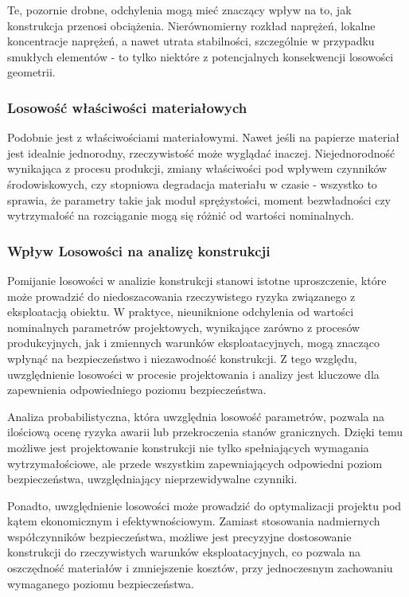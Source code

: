 Te, pozornie drobne, odchylenia mogą mieć znaczący wpływ na to, jak konstrukcja przenosi obciążenia.
Nierównomierny rozkład naprężeń, lokalne koncentracje naprężeń, a nawet utrata stabilności, szczególnie w przypadku smukłych elementów - to tylko niektóre z potencjalnych konsekwencji losowości geometrii.

\subsubsection*{Losowość właściwości materiałowych}

Podobnie jest z właściwościami materiałowymi.
Nawet jeśli na papierze materiał jest idealnie jednorodny, rzeczywistość może wyglądać inaczej.
Niejednorodność wynikająca z procesu produkcji, zmiany właściwości pod wpływem czynników środowiskowych, czy stopniowa degradacja materiału w czasie - wszystko to sprawia, że parametry takie jak moduł sprężystości, moment bezwładności czy wytrzymałość na rozciąganie mogą się różnić od wartości nominalnych.

\subsubsection*{Wpływ Losowości na analizę konstrukcji}

Pomijanie losowości w analizie konstrukcji stanowi istotne uproszczenie, które może prowadzić do niedoszacowania rzeczywistego ryzyka związanego z eksploatacją obiektu.
W praktyce, nieuniknione odchylenia od wartości nominalnych parametrów projektowych, wynikające zarówno z procesów produkcyjnych, jak i zmiennych warunków eksploatacyjnych, mogą znacząco wpłynąć na bezpieczeństwo i niezawodność konstrukcji.
Z tego względu, uwzględnienie losowości w procesie projektowania i analizy jest kluczowe dla zapewnienia odpowiedniego poziomu bezpieczeństwa.

Analiza probabilistyczna, która uwzględnia losowość parametrów, pozwala na ilościową ocenę ryzyka awarii lub przekroczenia stanów granicznych.
Dzięki temu możliwe jest projektowanie konstrukcji nie tylko spełniających wymagania wytrzymałościowe, ale przede wszystkim zapewniających odpowiedni poziom bezpieczeństwa, uwzględniający nieprzewidywalne czynniki.

Ponadto, uwzględnienie losowości może prowadzić do optymalizacji projektu pod kątem ekonomicznym i efektywnościowym.
Zamiast stosowania nadmiernych współczynników bezpieczeństwa, możliwe jest precyzyjne dostosowanie konstrukcji do rzeczywistych warunków eksploatacyjnych, co pozwala na oszczędność materiałów i zmniejszenie kosztów, przy jednoczesnym zachowaniu wymaganego poziomu bezpieczeństwa.

